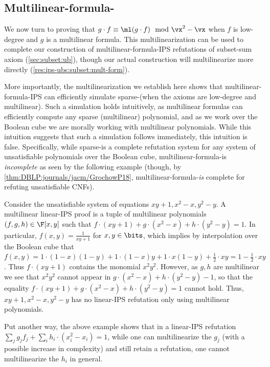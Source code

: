 \documentclass{toc}
\begin{document}
\subsection{Multilinear-formula-\lbIPS}\label{sec:multilinearization:mult-form}

We now turn to proving that $g\cdot f\equiv \ml(g\cdot f) \mod \vx^2-\vx$ when $f$ is low-degree and $g$ is a multilinear formula.  This multilinearization can be used to complete our construction of multilinear-formula-IPS refutations of subset-sum axiom (\autoref{sec:subset:ub}), though our actual construction will multilinearize more directly (\autoref{res:ips-ubs:subset:mult-form}).

More importantly, the multilinearization we establish here shows that multilinear-formula-IPS can efficiently simulate sparse-\lIPS (when the axioms are low-degree and multilinear).  Such a simulation holds intuitively, as multilinear formulas can efficiently compute any sparse (multilinear) polynomial, and as we work over the Boolean cube we are morally working with multilinear polynomials.  While this intuition suggests that such a simulation follows immediately, this intuition is false. Specifically, while sparse-\lIPS is a complete refutation system for any system of unsatisfiable polynomials over the Boolean cube, multilinear-formula-\lIPS is \emph{incomplete} as seen by the following example (though, by \autoref{thm:DBLP:journals/jacm/GrochowP18}, multilinear-formula-\lIPS \emph{is} complete for refuting unsatisfiable CNFs).

\begin{example}\label{ex:multi-form:incomplete}
        Consider the unsatisfiable system of equations $xy+1,x^2-x,y^2-y$.  A multilinear linear-IPS proof is a tuple of multilinear polynomials $(f,g,h)\in\F[x,y]$ such that $f\cdot (xy+1)+g\cdot (x^2-x)+h\cdot (y^2-y)=1$.  In particular, $f(x,y)=\frac{1}{xy+1}$ for $x,y\in\bits$, which implies by interpolation over the Boolean cube that $f(x,y)=1\cdot (1-x)(1-y)+1\cdot (1-x)y+1\cdot x(1-y)+\frac{1}{2} \cdot xy=1-\frac{1}{2}\cdot xy$.  Thus $f\cdot (xy+1)$ contains the monomial $x^2y^2$.  However, as $g,h$ are multilinear we see that $x^2y^2$ cannot appear in $g\cdot (x^2-x)+h\cdot (y^2-y)-1$, so that the equality $f\cdot (xy+1)+g\cdot (x^2-x)+h\cdot (y^2-y)=1$ cannot hold. Thus, $xy+1,x^2-x,y^2-y$ has no linear-IPS refutation only using multilinear polynomials.
\end{example}

Put another way, the above example shows that in a linear-IPS refutation $\sum_j g_j f_j+\sum_i h_i\cdot (x_i^2-x_i)=1$, while one can multilinearize the $g_j$ (with a possible increase in complexity) and still retain a refutation, one cannot multilinearize the $h_i$ in general.
\end{document}
